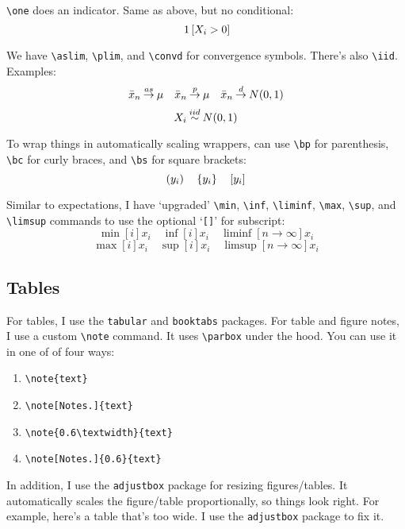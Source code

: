 \documentclass[12pt]{article}
\begin{document}
\texttt{\textbackslash one} does an indicator. Same as above, but no conditional:
$$\one{X_i > 0}$$

We have \texttt{\textbackslash aslim}, \texttt{\textbackslash plim}, and \texttt{\textbackslash convd} for convergence symbols. There's also \texttt{\textbackslash iid}. Examples:
$$\bar{x}_n \mathbin{\overset{as}{\to}} \mu \quad \bar{x}_n \mathbin{\overset{p}{\to}} \mu \quad \bar{x}_n \mathbin{\overset{d}{\to}} N(0, 1)$$
$$X_i \mathbin{\overset{iid}{\sim}} N(0, 1)$$

To wrap things in automatically scaling wrappers, can use \texttt{\textbackslash bp} for parenthesis, \texttt{\textbackslash bc} for curly braces, and \texttt{\textbackslash bs} for square brackets:
$$\left( y_i \right) \quad \left\lbrace y_i \right\rbrace \quad \left[ y_i \right]$$

Similar to expectations, I have `upgraded' \texttt{\textbackslash min}, \texttt{\textbackslash inf}, \texttt{\textbackslash liminf}, \texttt{\textbackslash max}, \texttt{\textbackslash sup}, and \texttt{\textbackslash limsup} commands to use the optional `\texttt{[]}' for subscript:
$$\min[i]{x_i} \quad \inf[i]{x_i} \quad \liminf[n \to \infty]{x_i}$$
$$\max[i]{x_i} \quad \sup[i]{x_i} \quad \limsup[n \to \infty]{x_i}$$


\subsection{Tables}

For tables, I use the \texttt{tabular} and \texttt{booktabs} packages. For table and figure notes, I use a custom \texttt{\textbackslash note} command. It uses \texttt{\textbackslash parbox} under the hood. You can use it in one of of four ways:
\begin{enumerate}
  \item \texttt{\textbackslash note\{text\}}
  \item \texttt{\textbackslash note[Notes.]\{text\}}
  \item \texttt{\textbackslash note\{0.6\textbackslash textwidth\}\{text\}}
  \item \texttt{\textbackslash note[Notes.]\{0.6\textwidth\}\{text\}}
\end{enumerate}

In addition, I use the \texttt{adjustbox} package for resizing figures/tables. It automatically scales the figure/table proportionally, so things look right. For example, here's a table that's too wide. I use the \texttt{adjustbox} package to fix it.
\end{document}
